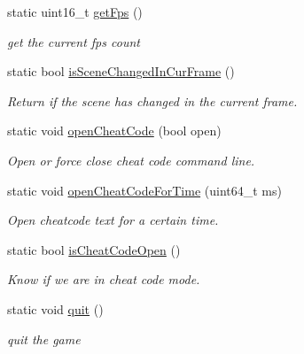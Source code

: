\begin{DoxyCompactItemize}
static uint16\+\_\+t \hyperlink{class_scene_manager_a5fcdd1b1f88f235ca33abc94f01d3755}{get\+Fps} ()
\begin{DoxyCompactList}\small\item\em get the current fps count \end{DoxyCompactList}\item 
static bool \hyperlink{class_scene_manager_a7163901c7efca6117be5a8911eb6adce}{is\+Scene\+Changed\+In\+Cur\+Frame} ()
\begin{DoxyCompactList}\small\item\em Return if the scene has changed in the current frame. \end{DoxyCompactList}\item 
static void \hyperlink{class_scene_manager_a391bfd7e765b42a09993977b7371df32}{open\+Cheat\+Code} (bool open)
\begin{DoxyCompactList}\small\item\em Open or force close cheat code command line. \end{DoxyCompactList}\item 
static void \hyperlink{class_scene_manager_a06344fee3566d4f109307391a1fdf771}{open\+Cheat\+Code\+For\+Time} (uint64\+\_\+t ms)
\begin{DoxyCompactList}\small\item\em Open cheatcode text for a certain time. \end{DoxyCompactList}\item 
static bool \hyperlink{class_scene_manager_adf58aea97d9dc2a8a21b15012e40076b}{is\+Cheat\+Code\+Open} ()
\begin{DoxyCompactList}\small\item\em Know if we are in cheat code mode. \end{DoxyCompactList}\item 
\mbox{\label{class_scene_manager_a580b0599c8d244f4eaecc6568041580b}} 
static void \hyperlink{class_scene_manager_a580b0599c8d244f4eaecc6568041580b}{quit} ()
\begin{DoxyCompactList}\small\item\em quit the game \end{DoxyCompactList}\end{DoxyCompactItemize}
